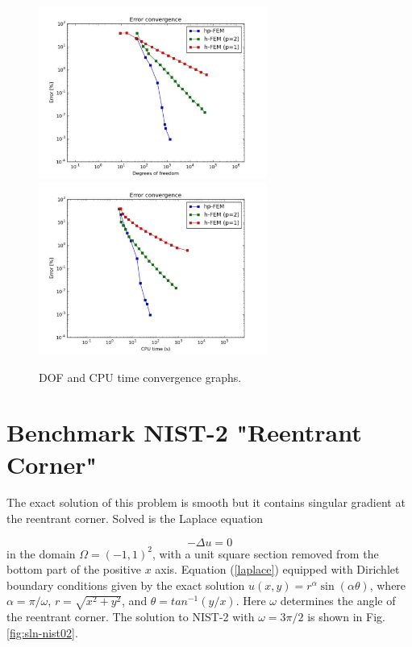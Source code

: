 \documentclass[12pt]{elsarticle}
\begin{document}
\begin{figure}[H]
\centering
\hspace{-50mm}
\includegraphics[width=7.5cm]{mafig5.pdf}\ \
\hspace{-8mm}
\includegraphics[width=7.5cm]{mafig6.pdf}
\hspace{-50mm}
\vspace{-2mm}
\caption{DOF and CPU time convergence graphs.}
\label{fig:nist-1-conv}
\end{figure}


\section{Benchmark NIST-2 "Reentrant Corner"}
\label{sec:bench-2}

The exact solution of this problem is smooth but it contains
singular gradient at the reentrant corner.
Solved is the Laplace equation

\begin{equation} \label{laplace}
-\Delta u = 0
\end{equation}
in the domain $\Omega = (-1, 1)^2$, with a unit square
section removed from the bottom part of the positive $x$ axis.
Equation (\ref{laplace}) equipped with Dirichlet
boundary conditions given by the exact solution
$u(x, y) = r^{\alpha}\sin(\alpha \theta)$,
where $\alpha = \pi / \omega$, $r = \sqrt{x^2+y^2}$,
and $\theta = tan^{-1}(y/x)$. Here $\omega $ determines
the angle of the reentrant corner.
The solution to NIST-2 with $\omega = 3 \pi / 2$
is shown in Fig. \ref{fig:sln-nist02}.
\end{document}
